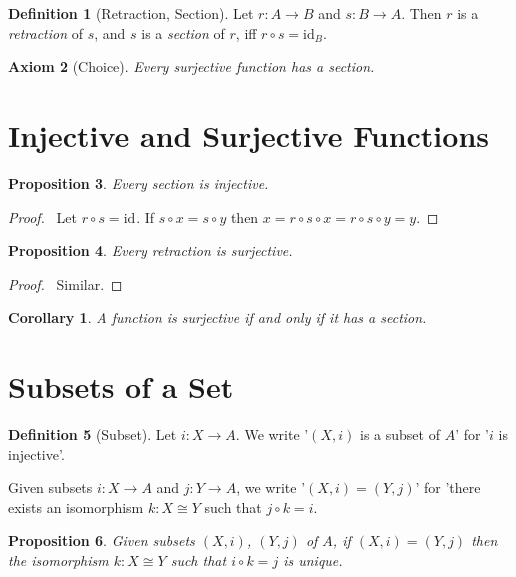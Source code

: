\documentclass{book}
\let\qed\relax
\newtheorem{ax}{Axiom}[chapter]
\newtheorem{prop}[ax]{Proposition}
\newtheorem{cor}{Corollary}[ax]
\theoremstyle{definition}
\newtheorem{df}[ax]{Definition}
\newcommand{\id}[1]{\ensuremath{\mathrm{id}_{#1}}}
\begin{document}
\begin{df}[Retraction, Section]
Let $r : A \rightarrow B$ and $s : B \rightarrow A$. Then $r$ is a \emph{retraction} of $s$, and $s$ is a \emph{section} of $r$, iff $r \circ s = \id{B}$.
\end{df}

\begin{ax}[Choice]
Every surjective function has a section.
\end{ax}

\section{Injective and Surjective Functions}

\begin{prop}
Every section is injective.
\end{prop}

\begin{proof}
\pf\ Let $r \circ s = \id{}$. If $s \circ x = s \circ y$ then $x = r \circ s \circ x = r \circ s \circ y = y$. \qed
\end{proof}

\begin{prop}
Every retraction is surjective.
\end{prop}

\begin{proof}
\pf\ Similar. \qed
\end{proof}

\begin{cor}
A function is surjective if and only if it has a section.
\end{cor}

\section{Subsets of a Set}

\begin{df}[Subset]
Let $i : X \rightarrow A$. We write '$(X,i)$ is a subset of $A$' for '$i$ is injective'.

Given subsets $i : X \rightarrow A$ and $j : Y \rightarrow A$,
we write '$(X,i) = (Y,j)$' for 'there exists an isomorphism $k : X \cong Y$ such that $j \circ k = i$.
\end{df}

\begin{prop}
Given subsets $(X,i)$, $(Y,j)$ of $A$, if $(X,i) = (Y,j)$ then the isomorphism $k : X \cong Y$ such that $i \circ k = j$ is unique.
\end{prop}
\end{document}
